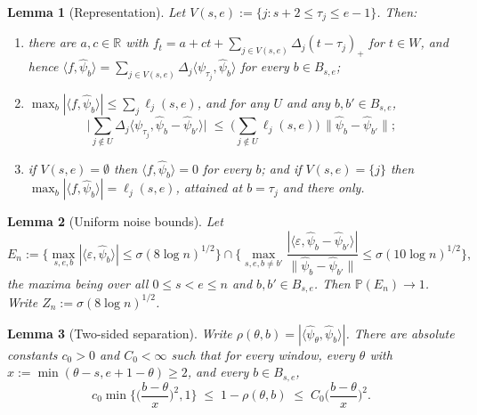 \documentclass[10pt,a4paper]{amsart}
\newtheorem{lemma}{Lemma}
\begin{document}
\begin{lemma}[Representation]
\label{lem:rep}
Let $V(s,e) := \{ j : s+2 \le \tau_j \le e-1 \}$. Then:
\begin{enumerate}
\item[\emph{(a)}] there are $a,c \in \mathbb{R}$ with
$f_t = a + ct + \sum_{j \in V(s,e)} \Delta_j (t-\tau_j)_+$ for $t \in W$, and
hence
$\langle f, \hat\psi_b\rangle = \sum_{j \in V(s,e)} \Delta_j \langle
\psi_{\tau_j}, \hat\psi_b\rangle$ for every $b \in B_{s,e}$;
\item[\emph{(b)}] $\max_{b} |\langle f, \hat\psi_b\rangle| \le \sum_j
\ell_j(s,e)$, and for any $U$ and any $b, b' \in B_{s,e}$,
\[
\Big| \sum_{j \notin U} \Delta_j \langle \psi_{\tau_j},
\hat\psi_b - \hat\psi_{b'} \rangle \Big|
\;\le\; \Big( \sum_{j \notin U} \ell_j(s,e) \Big)\,
\|\hat\psi_b - \hat\psi_{b'}\| ;
\]
\item[\emph{(c)}] if $V(s,e) = \emptyset$ then $\langle f,\hat\psi_b\rangle = 0$
for every $b$; and if $V(s,e) = \{j\}$ then
$\max_b |\langle f,\hat\psi_b\rangle| = \ell_j(s,e)$, attained at $b = \tau_j$
and there only.
\end{enumerate}
\end{lemma}

\begin{lemma}[Uniform noise bounds]
\label{lem:noise}
Let
\[
E_n := \Big\{ \max_{s,e,b} |\langle \varepsilon, \hat\psi_b\rangle| \le
\sigma(8\log n)^{1/2} \Big\} \cap
\Big\{ \max_{s,e,b \ne b'} \frac{|\langle \varepsilon, \hat\psi_b -
\hat\psi_{b'}\rangle|}{\|\hat\psi_b - \hat\psi_{b'}\|} \le
\sigma(10\log n)^{1/2} \Big\},
\]
the maxima being over all $0 \le s < e \le n$ and $b,b' \in B_{s,e}$. Then
$\mathbb{P}(E_n) \to 1$. Write $Z_n := \sigma(8\log n)^{1/2}$.
\end{lemma}

\begin{lemma}[Two-sided separation]
\label{lem:sep}
Write $\rho(\theta,b) = |\langle \hat\psi_\theta, \hat\psi_b\rangle|$. There
are absolute constants $c_0 > 0$ and $C_0 < \infty$ such that for every window,
every $\theta$ with $x := \min(\theta-s, e+1-\theta) \ge 2$, and every
$b \in B_{s,e}$,
\[
c_0 \min\Big\{ \Big(\frac{b-\theta}{x}\Big)^2, 1 \Big\} \;\le\;
1 - \rho(\theta,b) \;\le\; C_0 \Big(\frac{b-\theta}{x}\Big)^2 .
\]
\end{lemma}
\end{document}

